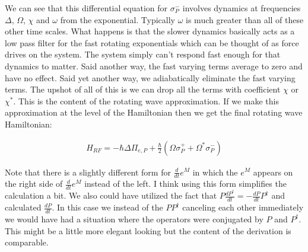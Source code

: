 \documentclass[12pt]{article}
\newcommand{\ddt}[1]{\frac{d #1}{dt}}
\begin{document}
We can see that this differential equation for $\sigma^-_P$ involves dynamics at frequencies $\Delta$, $\Omega$, $\chi$ and $\omega$ from the exponential. Typically $\omega$ is much greater than all of these other time scales. What happens is that the slower dynamics basically acts as a low pass filter for the fast rotating exponentials which can be thought of as force drives on the system. The system simply can't respond fast enough for that dynamics to matter. Said another way, the fast varying terms average to zero and have no effect. Said yet another way, we adiabatically eliminate the fast varying terms. The upshot of all of this is we can drop all the terms with coefficient $\chi$ or $\chi^*$. This is the content of the rotating wave approximation. If we make this approximation at the level of the Hamiltonian then we get the final rotating wave Hamiltonian:

\begin{align}
H_{RF} = -\hbar \Delta \Pi_{e,P} + \frac{\hbar}{2}(\Omega \sigma^+_P + \Omega^* \sigma^-_P)
\end{align}

Note that there is a slightly different form for $\ddt{}e^{M}$ in which the $e^{M}$ appears on the right side of $\ddt{}e^{M}$ instead of the left. I think using this form simplifies the calculation a bit. We also could have utilized the fact that $P\ddt{P^{\dag}} = -\ddt{P}P^{\dag}$ and calculated $\ddt{P}$. In this case we instead of the $PP^{\dag}$ canceling each other immediately we would have had a situation where the operators were conjugated by $P$ and $P^{\dag}$. This might be a little more elegant looking but the content of the derivation is comparable.
\end{document}
